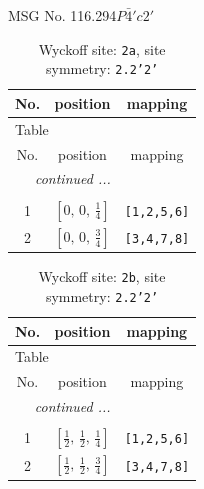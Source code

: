 \documentclass[fleqn,8pt]{jsarticle}
\begin{document}
\setcounter{MaxMatrixCols}{32}

\renewcommand{\tablename}{Table~}
\renewcommand{\figurename}{Figure~}
\begin{center}
\LARGE
MSG No. 116.294\quad$P\bar{4}'c2'$
\end{center}
\renewcommand{\arraystretch}{1.2}
\begin{longtable}{ccc}
\caption{Wyckoff site: {\tt 2a}, site symmetry: {\tt 2.2'2'}}
 \\
 \hline \hline
No. & position & mapping \\ \hline \endfirsthead

\multicolumn{2}{l}{\tablename\ \thetable{}} \\
 \hline \hline
No. & position & mapping \\ \hline \endhead

 \hline \hline
\multicolumn{2}{r}{\footnotesize\it continued ...} \\ \endfoot

 \hline \hline
\multicolumn{2}{r}{} \\ \endlastfoot

1 & $\left[ 0,\, 0,\, \frac{1}{4} \right]$ & {\tt [1,2,5,6]} \\ \hline
2 & $\left[ 0,\, 0,\, \frac{3}{4} \right]$ & {\tt [3,4,7,8]} \\
\end{longtable}
\renewcommand{\arraystretch}{1.2}
\begin{longtable}{ccc}
\caption{Wyckoff site: {\tt 2b}, site symmetry: {\tt 2.2'2'}}
 \\
 \hline \hline
No. & position & mapping \\ \hline \endfirsthead

\multicolumn{2}{l}{\tablename\ \thetable{}} \\
 \hline \hline
No. & position & mapping \\ \hline \endhead

 \hline \hline
\multicolumn{2}{r}{\footnotesize\it continued ...} \\ \endfoot

 \hline \hline
\multicolumn{2}{r}{} \\ \endlastfoot

1 & $\left[ \frac{1}{2},\, \frac{1}{2},\, \frac{1}{4} \right]$ & {\tt [1,2,5,6]} \\ \hline
2 & $\left[ \frac{1}{2},\, \frac{1}{2},\, \frac{3}{4} \right]$ & {\tt [3,4,7,8]} \\
\end{longtable}
\end{document}
